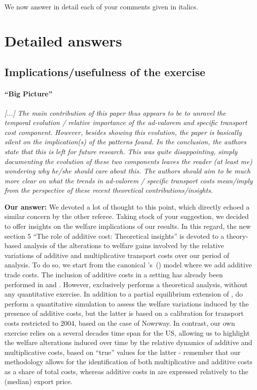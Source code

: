 \documentclass[a4paper,11pt]{article}
\newcommand\cites[1]{\citeauthor{#1}'s\ (\citeyear{#1})}
\begin{document}
We now answer in detail each of your comments given in italics.

\section{Detailed answers \label{sec:detailed_answers}}

\subsection{Implications/usefulness of the exercise}

\paragraph{``Big Picture''} \textit{[...] The main contribution of this paper thus appears to be to unravel the temporal evolution / relative importance of the ad-valorem and specific transport cost component. However, besides showing this evolution, the paper is basically silent on the implication(s) of the patterns found. In the conclusion, the authors state that this is left for future research. This was quite disappointing, simply documenting the evolution of these two components leaves the reader (at least me) wondering why he/she should care about this. The authors should aim to be much more clear on what the trends in ad-valorem / specific transport costs mean/imply from the perspective of these recent theoretical contributions/insights.} \smallskip


\textbf{Our answer:} We devoted a lot of thought to this point, which directly echoed a similar concern by the other referee. Taking stock of your suggestion, we decided to offer insights on the welfare implications of our results. In this regard, the new section 5 ``The role of additive cost: Theoretical insights'' is devoted to a theory-based analysis of the alterations to welfare gains involved by the relative variations of additive and multiplicative transport costs over our period of analysis. To do so, we start from the canonical \cites{melitz} model where we add additive trade costs. The inclusion of additive costs in a \citet{melitz} setting has already been performed in \citet{sorensen2014} and \citet{Irrazabal_2015}. However, \citet{sorensen2014} exclusively performs a theoretical analysis, without any quantitative exercise. In addition to a partial equilibrium extension of \citet{melitz}, \citet{Irrazabal_2015} do perform a quantitative simulation to assess the welfare variations induced by the presence of additive costs, but the latter is based on a calibration for transport costs restricted to 2004, based on the case of Nowrway. In contrast, our own exercise relies on a several decades time span for the US, allowing us to highlight the welfare alterations induced over time by the relative dynamics of additive and multiplicative costs, based on ``true'' values for the latter - remember that our methodology allows for the identification of both multiplicative and additive costs as a share of total costs, whereas additive costs in \citet{Irrazabal_2015} are expressed relatively to the (median) export price.
\end{document}
